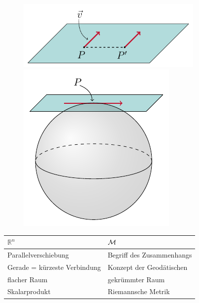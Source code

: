 \begin{figure}[H]
\begin{figure}[H]
\includegraphics[scale=0.8]{figures/tikz/plane.pdf}
\hspace{2cm}
\includegraphics[scale=0.9]{figures/tikz/sphere_with_plane.pdf}
\end{figure}
\centering
\begin{tabular}{>{\centering}p{} | >{\centering}p{}} 
$\mathbb{R}^n$ \vspace{5pt} & $\Huge\mathcal{M}$  \vspace{5pt} \tabularnewline \hline 
\vspace{5pt} Parallelverschiebung & \vspace{5pt} Begriff des Zusammenhangs\tabularnewline 
\vspace{5pt} Gerade = kürzeste Verbindung & \vspace{5pt} Konzept der Geodätischen \tabularnewline 
\vspace{5pt} flacher Raum & \vspace{5pt} gekrümmter Raum \tabularnewline 
\vspace{5pt} Skalarprodukt & \vspace{5pt} Riemannsche Metrik \tabularnewline 
\end{tabular}
\end{figure}

